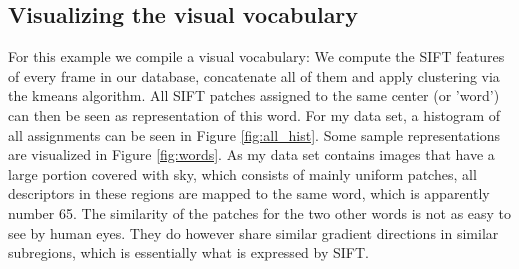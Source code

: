 \documentclass{paper}
\begin{document}
\subsection{Visualizing the visual vocabulary}
For this example we compile a visual vocabulary: We compute the SIFT features of every 
frame in our database, concatenate all of them and apply clustering via the kmeans 
algorithm. All SIFT patches assigned to the same center (or 'word') can then be 
seen as representation of this word. For my data set, a histogram of all assignments can be
seen in Figure \ref{fig:all_hist}. Some sample representations are visualized in Figure 
\ref{fig:words}. As my data set contains images that have a large portion covered with sky,
which consists of mainly uniform patches, all descriptors in these regions are mapped to
the same word, which is apparently number 65. The similarity of the patches for the two 
other words is not as easy to see by human eyes. They do however share similar gradient
directions in similar subregions, which is essentially what is expressed by SIFT. 
\end{document}

